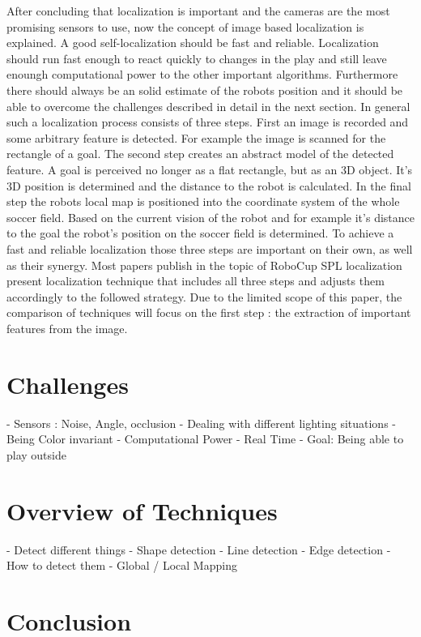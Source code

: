 \documentclass[12pt, a4paper]{scrartcl}
\begin{document}
  After concluding that localization is important and the cameras are the most promising sensors to use, now the concept of image based localization is explained. A good self-localization should be fast and reliable. Localization should run fast enough to react quickly to changes in the play and still leave enoungh computational power to the other important algorithms. Furthermore there should always be an solid estimate of the robots position and it should be able to overcome the challenges described in detail in the next section. In general such a localization process consists of three steps. First an image is recorded and some arbitrary feature is detected. For example the image is scanned for the rectangle of a goal. The second step creates an abstract model of the detected feature. A goal is perceived no longer as a flat rectangle, but as an 3D object. It's 3D position is determined and the distance to the robot is calculated. In the final step the robots local map is positioned into the coordinate system of the whole soccer field. Based on the current vision of the robot and for example it's distance to the goal the robot's position on the soccer field is determined. To achieve a fast and reliable localization those three steps are important on their own, as well as their synergy. Most papers publish in the topic of RoboCup SPL localization present localization technique that includes all three steps and adjusts them accordingly to the followed strategy. Due to the limited scope of this paper, the comparison of techniques will focus on the first step : the extraction of important features from the image.

  \section{Challenges}
  - Sensors : Noise, Angle, occlusion
  - Dealing with different lighting situations
  - Being Color invariant
  - Computational Power
  - Real Time
  - Goal: Being able to play outside

  \section{Overview of Techniques}
  - Detect different things
  - Shape detection
  - Line detection
  - Edge detection
  - How to detect them
  - Global / Local Mapping

  \section{Conclusion}
\end{document}

